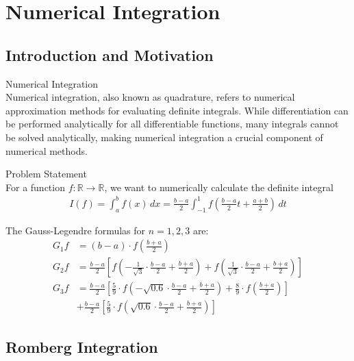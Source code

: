 \section{Numerical Integration}

\subsection{Introduction and Motivation}

\begin{definition}{Numerical Integration}\\
Numerical integration, also known as quadrature, refers to numerical approximation methods for evaluating definite integrals. While differentiation can be performed analytically for all differentiable functions, many integrals cannot be solved analytically, making numerical integration a crucial component of numerical methods.
\end{definition}

\begin{concept}{Problem Statement}\\
For a function $f: \mathbb{R} \rightarrow \mathbb{R}$, we want to numerically calculate the definite integral
\begin{align*}
I(f) = \int_a^b f(x) \, dx = \frac{b-a}{2}\int_{-1}^{1} f\left(\frac{b-a}{2}t + \frac{a+b}{2}\right) \, dt
\end{align*}

The Gauss-Legendre formulas for $n=1, 2, 3$ are:
\begin{align*}
G_1f &= (b-a) \cdot f\left(\frac{b+a}{2}\right)\\
G_2f &= \frac{b-a}{2}\left[f\left(-\frac{1}{\sqrt{3}}\cdot\frac{b-a}{2} + \frac{b+a}{2}\right) + f\left(\frac{1}{\sqrt{3}}\cdot\frac{b-a}{2} + \frac{b+a}{2}\right)\right]\\
G_3f &= \frac{b-a}{2}\left[\frac{5}{9}\cdot f\left(-\sqrt{0.6}\cdot\frac{b-a}{2} + \frac{b+a}{2}\right) + \frac{8}{9}\cdot f\left(\frac{b+a}{2}\right)\right]\\
&+ \frac{b-a}{2}\left[\frac{5}{9}\cdot f\left(\sqrt{0.6}\cdot\frac{b-a}{2} + \frac{b+a}{2}\right)\right]
\end{align*}
\end{concept}

\subsection{Romberg Integration}


